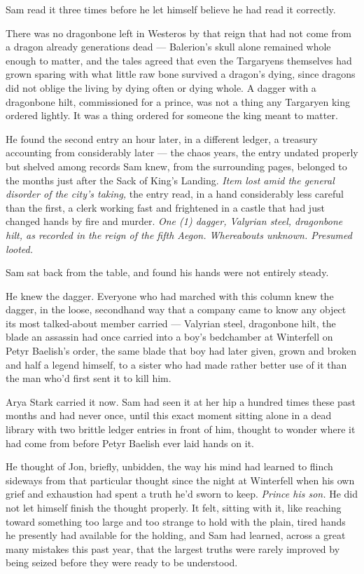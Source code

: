 Sam read it three times before he let himself believe he had read it correctly.

There was no dragonbone left in Westeros by that reign that had not come from a dragon already generations dead — Balerion’s skull alone remained whole enough to matter, and the tales agreed that even the Targaryens themselves had grown sparing with what little raw bone survived a dragon’s dying, since dragons did not oblige the living by dying often or dying whole. A dagger with a dragonbone hilt, commissioned for a prince, was not a thing any Targaryen king ordered lightly. It was a thing ordered for someone the king meant to matter.

He found the second entry an hour later, in a different ledger, a treasury accounting from considerably later — the chaos years, the entry undated properly but shelved among records Sam knew, from the surrounding pages, belonged to the months just after the Sack of King’s Landing. \textit{Item lost amid the general disorder of the city’s taking,} the entry read, in a hand considerably less careful than the first, a clerk working fast and frightened in a castle that had just changed hands by fire and murder. \textit{One (1) dagger, Valyrian steel, dragonbone hilt, as recorded in the reign of the fifth Aegon. Whereabouts unknown. Presumed looted.}

Sam sat back from the table, and found his hands were not entirely steady.

\sceneBreak

He knew the dagger. Everyone who had marched with this column knew the dagger, in the loose, secondhand way that a company came to know any object its most talked-about member carried — Valyrian steel, dragonbone hilt, the blade an assassin had once carried into a boy’s bedchamber at Winterfell on Petyr Baelish’s order, the same blade that boy had later given, grown and broken and half a legend himself, to a sister who had made rather better use of it than the man who’d first sent it to kill him.

Arya Stark carried it now. Sam had seen it at her hip a hundred times these past months and had never once, until this exact moment sitting alone in a dead library with two brittle ledger entries in front of him, thought to wonder where it had come from before Petyr Baelish ever laid hands on it.

He thought of Jon, briefly, unbidden, the way his mind had learned to flinch sideways from that particular thought since the night at Winterfell when his own grief and exhaustion had spent a truth he’d sworn to keep. \textit{Prince his son.} He did not let himself finish the thought properly. It felt, sitting with it, like reaching toward something too large and too strange to hold with the plain, tired hands he presently had available for the holding, and Sam had learned, across a great many mistakes this past year, that the largest truths were rarely improved by being seized before they were ready to be understood.

